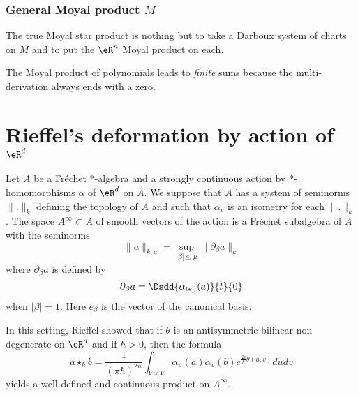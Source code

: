 \subsubsection{General Moyal product \texorpdfstring{$M$}{M}}

The true Moyal star product is nothing but to take a Darboux system of charts on $M$ and to put the $\eR^n$ Moyal product on each.

\begin{remark}
The Moyal product of polynomials leads to \emph{finite} sums because the multi-derivation always ends with a zero.
\end{remark}

\section{Rieffel's deformation by action of \texorpdfstring{$\eR^d$}{Rd}}

Let $A$ be a Fréchet $*$-algebra and a strongly continuous action by $*$-homomorphisms $\alpha$ of $\eR^d$ on $A$. We suppose that $A$ has a system of seminorms $\| . \|_k$ defining the topology of $A$ and such that $\alpha_v$ is an isometry for each $\| . \|_k$. The space $A^{\infty}\subset A$ of smooth vectors of the action is a Fréchet subalgebra of $A$ with the seminorms
\begin{equation}
	\| a \|_{k,\mu}=\sup_{| \beta |\leq\mu}\| \partial_{\beta}a \|_k
\end{equation}
where $\partial_{\beta}a$ is defined by
\begin{equation}
	\partial_{\beta}a=\Dsdd{ \alpha_{te_{\beta}}(a) }{t}{0}
\end{equation}
when $| \beta |=1$. Here $e_{\beta}$ is the vector of the canonical basis.

In this setting, Rieffel showed that if $\theta$ is an antisymmetric bilinear non degenerate on $\eR^d$ and if $\hbar>0$, then the formula
\begin{equation}
	a\star_{\hbar} b=\frac{1}{ (\pi \hbar)^{2n} }\int_{V\times V}\alpha_u(a)\alpha_v(b) e^{\frac{ 2i }{ \hbar }\theta(u,v)}dudv
\end{equation}
yields a well defined and continuous product on $A^{\infty}$.


